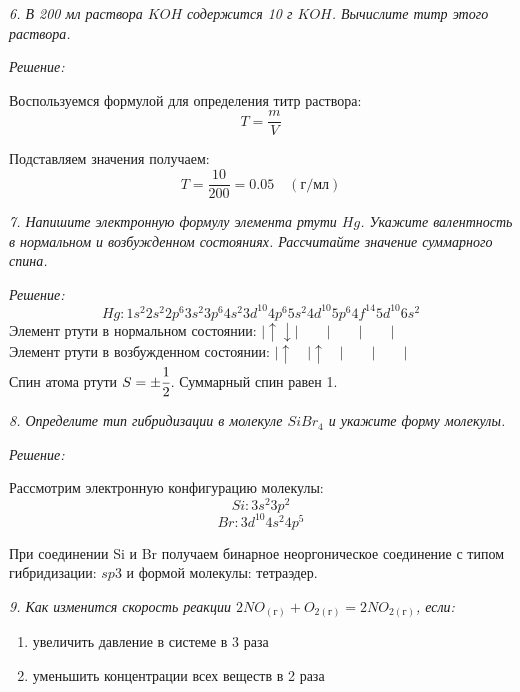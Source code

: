 \pagebreak

\emph{6. В 200 мл раствора \( KOH \) содержится 10 г \( KOH \). 
Вычислите титр этого раствора.}

\emph{Решение:}

Воспользуемся формулой для определения титр раствора:
\[
	T = \frac{m}{V}
\]

Подставляем значения получаем:
\[
	T = \frac{10}{200} = 0.05 \quad(\text{г/мл})
\]

\pagebreak

\emph{7. Напишите электронную формулу элемента ртути \( Hg \). Укажите 
валентность в нормальном и возбужденном состояниях. Рассчитайте значение 
суммарного спина.}

\emph{Решение:}
\[
	Hg: 1s^2 2s^2 2p^6 3s^2 3p^6 4s^2 3d^{10} 4p^6 5s^2 4d^{10} 5p^6
        4f^{14} 5d^{10} 6s^2
\]
Элемент ртути в нормальном состоянии: 
\(
	\vert\uparrow\downarrow\vert\quad\quad\vert\quad\quad\vert\quad\quad\vert
\) \\
Элемент ртути в возбужденном состоянии:
\(
	\vert\uparrow\quad\vert\uparrow\quad\vert\quad\quad\vert\quad\quad\vert
\) \\
Спин атома ртути \( S = \pm \cfrac{1}{2} \). Суммарный спин равен 1.

\pagebreak

\emph{8. Определите тип гибридизации в молекуле \( SiBr_4 \) и укажите 
форму молекулы.}

\emph{Решение:}

Рассмотрим электронную конфигурацию молекулы:
\[ Si: 3s^2 3p^2 \]
\[ Br: 3d^10 4s^2 4p^5 \]

При соединении Si и Br получаем бинарное неоргоническое соединение с 
типом гибридизации: \( sp3 \) и формой молекулы: тетраэдер.

\pagebreak

\emph{9. Как изменится скорость реакции 
\( 2NO_{(\text{г})} + O_{2(\text{г})} = 2NO_{2(\text{г})} \), если:}
\begin{enumerate}
    \item увеличить давление в системе в 3 раза
    \item уменьшить концентрации всех веществ в 2 раза
\end{enumerate}

